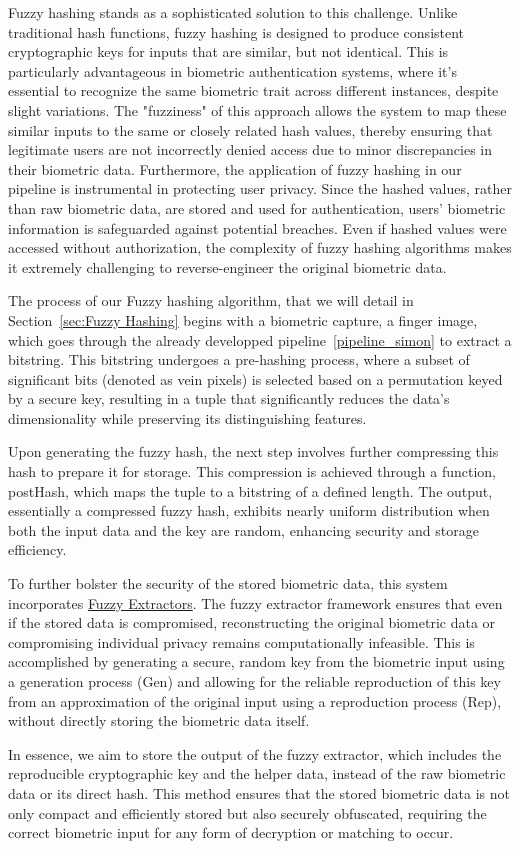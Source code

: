 Fuzzy hashing stands as a sophisticated solution to this challenge. Unlike traditional hash functions, fuzzy hashing is designed to produce consistent cryptographic keys for inputs that are similar, but not identical. This is particularly advantageous in biometric authentication systems, where it's essential to recognize the same biometric trait across different instances, despite slight variations. The "fuzziness" of this approach allows the system to map these similar inputs to the same or closely related hash values, thereby ensuring that legitimate users are not incorrectly denied access due to minor discrepancies in their biometric data.
Furthermore, the application of fuzzy hashing in our pipeline is instrumental in protecting user privacy. Since the hashed values, rather than raw biometric data, are stored and used for authentication, users' biometric information is safeguarded against potential breaches. Even if hashed values were accessed without authorization, the complexity of fuzzy hashing algorithms makes it extremely challenging to reverse-engineer the original biometric data.

The process of our Fuzzy hashing algorithm, that we will detail in Section~\ref{sec:Fuzzy Hashing}  begins with a biometric capture, a finger image, which goes through the already developped pipeline~\ref{pipeline_simon} to extract a bitstring. This bitstring undergoes a pre-hashing process, where a subset of significant bits (denoted as vein pixels) is selected based on a permutation keyed by a secure key, resulting in a tuple that significantly reduces the data's dimensionality while preserving its distinguishing features.

Upon generating the fuzzy hash, the next step involves further compressing this hash to prepare it for storage. This compression is achieved through a function, postHash, which maps the tuple to a bitstring of a defined length. The output, essentially a compressed fuzzy hash, exhibits nearly uniform distribution when both the input data and the key are random, enhancing security and storage efficiency.

To further bolster the security of the stored biometric data, this system incorporates \hyperref[def:Fuzzy_Extractors]{Fuzzy Extractors}. The fuzzy extractor framework ensures that even if the stored data is compromised, reconstructing the original biometric data or compromising individual privacy remains computationally infeasible. This is accomplished by generating a secure, random key from the biometric input using a generation process (Gen) and allowing for the reliable reproduction of this key from an approximation of the original input using a reproduction process (Rep), without directly storing the biometric data itself.

In essence, we aim to store the output of the fuzzy extractor, which includes the reproducible cryptographic key and the helper data, instead of the raw biometric data or its direct hash. This method ensures that the stored biometric data is not only compact and efficiently stored but also securely obfuscated, requiring the correct biometric input for any form of decryption or matching to occur.
